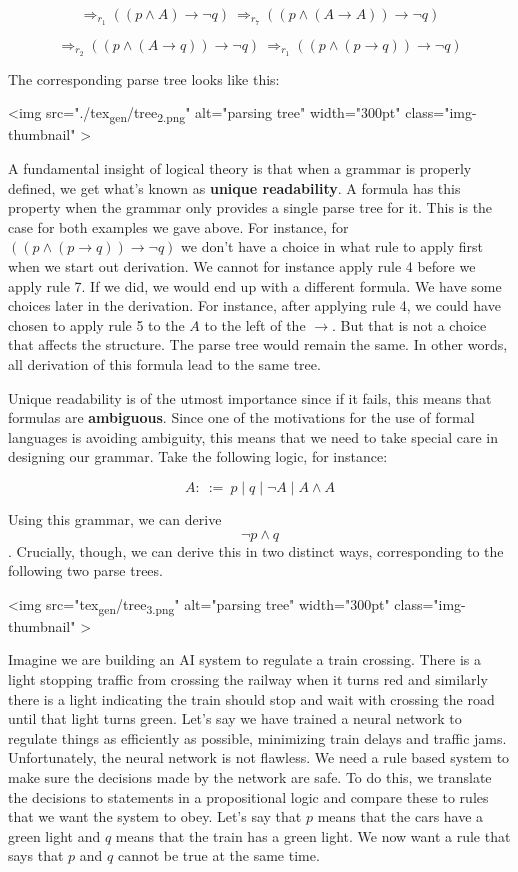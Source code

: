\documentclass[11pt]{article}
\begin{document}
$$\Longrightarrow_{r_1} ((p\land A)\rightarrow \neg q)\ \Longrightarrow_{r_7} ((p\land (A\rightarrow A))\rightarrow \neg q)$$ 

$$\Longrightarrow_{r_2} ((p\land (A\rightarrow q))\rightarrow\neg q)\ \Longrightarrow_{r_1} ((p\land (p\rightarrow q))\rightarrow\neg q)$$

The corresponding parse tree looks like this:

<img src="./tex\textsubscript{gen}/tree\textsubscript{2.png}" alt="parsing tree" width="300pt" class="img-thumbnail" >

A fundamental insight of logical theory is that when a grammar is properly
defined, we get what's known as \textbf{\textbf{unique readability}}. A formula has this property when the grammar only provides a single parse tree for it. This is the case for both examples we gave above. For instance, for \(((p\land (p\rightarrow q))\rightarrow\neg q)\) we don't have a choice in what rule to apply first when we start out derivation. We cannot for instance apply rule 4 before we apply rule 7. If we did, we would end up with a different formula. We have some choices later in the derivation. For instance, after applying rule 4, we could have chosen to apply rule 5 to the \(A\) to the left of the \(\rightarrow\). But that is not  a choice that affects the structure. The parse tree would remain the same. In other words, all derivation of this formula lead to the same tree.

Unique readability is of
the utmost importance since if it fails, this means that formulas are
\textbf{\textbf{ambiguous}}. Since one of the motivations for the use of formal languages is avoiding ambiguity, this means that we need to take special care in designing our grammar. Take the following logic, for instance:

$$ A:\ :=\ p \mid q \mid \neg A \mid A \land A$$

Using this grammar, we can derive $$\neg p\land q$$. Crucially, though, we can derive this in two distinct ways, corresponding to the following two parse trees.

<img src="tex\textsubscript{gen}/tree\textsubscript{3.png}" alt="parsing tree" width="300pt" class="img-thumbnail" >

Imagine we are building an AI system to regulate a train crossing. There is a light stopping traffic from crossing the railway when it turns red and similarly there is a light indicating the train should stop and wait with crossing the road until that light turns green. Let's say we have trained a neural network to regulate things as efficiently as possible, minimizing train delays and traffic jams. Unfortunately, the neural network is not flawless. We need a rule based system to make sure the decisions made by the network are safe. To do this, we translate the decisions to statements in a propositional logic and compare these to rules that we want the system to obey. Let's say that \(p\) means that the cars have a green light and \(q\) means that the train has a green light. We now want a rule that says that \(p\) and \(q\) cannot be true at the same time. 
\end{document}

